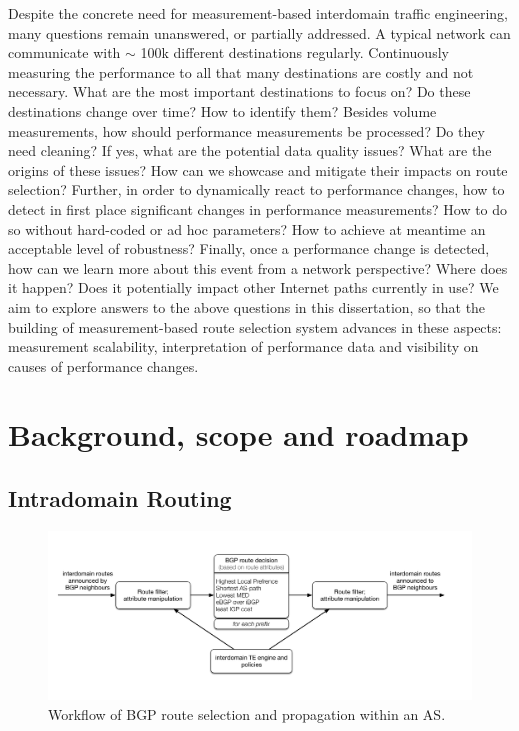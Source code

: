 Despite the concrete need for measurement-based interdomain traffic engineering, many questions remain unanswered, or partially addressed.
A typical network can communicate with $\sim$ 100k different destinations regularly. 
Continuously measuring the performance to all that many destinations are costly and not necessary. 
What are the most important destinations to focus on? Do these destinations change over time? How to identify them?
Besides volume measurements, how should performance measurements be processed? Do they need cleaning?
If yes, what are the potential data quality issues? What are the origins of these issues? How can we showcase and mitigate their impacts on route selection?
Further, in order to dynamically react to performance changes, how to detect in first place significant changes in performance measurements? How to do so without hard-coded or ad hoc parameters? How to achieve at meantime an acceptable level of robustness?
Finally, once a performance change is detected, how can we learn more about this event from a network perspective? Where does it happen? Does it potentially impact other Internet paths currently in use? 
We aim to explore answers to the above questions in this dissertation, so that the building of measurement-based route selection system advances in these aspects: measurement scalability, interpretation of performance data and visibility on causes of performance changes. 

\chapter{Background, scope and roadmap}
\section{Intradomain Routing}
\begin{figure}[!htb]
\centering
\includegraphics[width=1.3\textwidth]{gfx/chap1/bgp_decision.pdf}
\caption{Workflow of \acf{BGP} route selection and propagation within an \acf{AS}.}
\label{fig:bgp_decision}
\end{figure}

